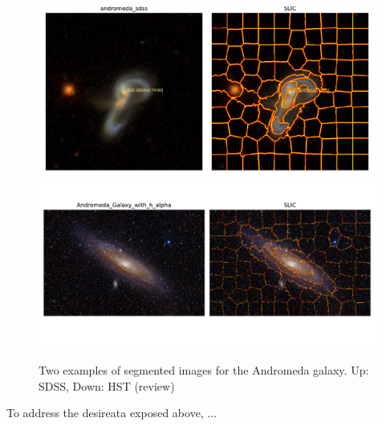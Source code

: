 \begin{figure}[h!]
    \centering

    \includegraphics[width=0.99\textwidth]{../figures/segmented_andromeda_sdss.pdf}
    \includegraphics[width=0.99\textwidth]{../figures/segmented_Andromeda_Galaxy_with_h_alpha.pdf}

  \caption{\small{Two examples of segmented images for the Andromeda galaxy. Up: SDSS, Down: HST (review) }}
  \label{fig: andromeda segmented}
\end{figure}


To address the desireata exposed above, \cite{ribeiro2016}...
